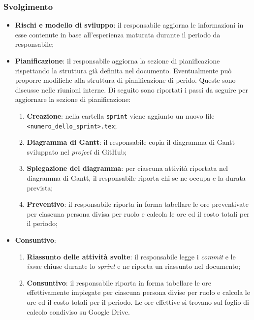 \subsubsection{Svolgimento}
\begin{itemize}
	\item \textbf{Rischi e modello di sviluppo}: il responsabile aggiorna
	      le informazioni in esse contenute in base all'esperienza maturata
	      durante il periodo da responsabile;

	\item \textbf{Pianificazione}: il responsabile aggiorna la sezione di
	      pianificazione rispettando la struttura già definita nel documento.
	      Eventualmente può proporre modifiche alla struttura di pianificazione
	      di perido. Queste sono discusse nelle riunioni interne.
	      Di seguito sono riportati i passi da seguire per aggiornare la sezione
	      di pianificazione:
	      \begin{enumerate}
		      \item \textbf{Creazione}: nella cartella \texttt{sprint} viene
		            aggiunto un nuovo file \texttt{<numero\_dello\_sprint>.tex};

		      \item \textbf{Diagramma di Gantt}: il responsabile copia il
		            diagramma di Gantt sviluppato nel \textit{project} di
		            GitHub\g;

		      \item \textbf{Spiegazione del diagramma}: per ciascuna attività
		            riportata nel diagramma di Gantt, il responsabile riporta
		            chi se ne occupa e la durata prevista;

		      \item \textbf{Preventivo}: il responsabile riporta in forma
		            tabellare le ore preventivate per ciascuna persona divisa
		            per ruolo e calcola le ore ed il costo totali per il
		            periodo;
	      \end{enumerate}

	\item \textbf{Consuntivo}:
	      \begin{enumerate}
		      \item \textbf{Riassunto delle attività svolte}: il responsabile
		            legge i \textit{commit} e le \textit{issue\g} chiuse durante
		            lo \textit{sprint} e ne riporta un riassunto nel documento;

		      \item \textbf{Consuntivo}: il responsabile riporta in forma
		            tabellare le ore effettivamente impiegate per ciascuna
		            persona divise per ruolo e calcola le ore ed il costo
		            totali per il periodo. Le ore effettive si trovano sul foglio di calcolo condiviso su Google Drive.


\end{enumerate}
\end{itemize}
